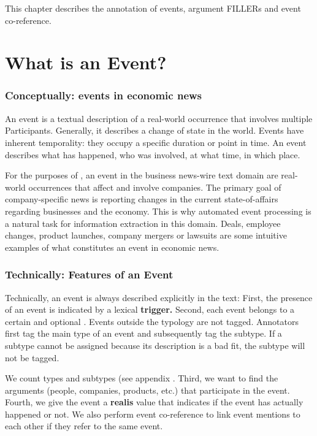 This chapter describes the annotation of events, argument FILLERs and event co-reference.

\section{What is an Event?}

\subsubsection{Conceptually: events in economic news}

An event is a textual description of a real-world occurrence that involves multiple Participants.
Generally, it describes a change of state in the world.
Events have inherent temporality: they occupy a specific duration or point in time.
An event describes what has happened, who was involved, at what time, in which place.

For the purposes of \project, an event in the business news-wire text domain are real-world occurrences that affect and involve companies.
The primary goal of company-specific news is reporting changes in the current state-of-affairs regarding businesses and the economy.
This is why automated event processing is a natural task for information extraction in this domain.
Deals, employee changes, product launches, company mergers or lawsuits are some intuitive examples of what constitutes an event in economic news. 

\subsubsection{Technically: Features of an Event}

Technically, an event is always described explicitly in the text:
First, the presence of an event is indicated by a lexical \textbf{trigger.}
Second, each event belongs to a certain  and optional .
Events outside the typology are not tagged.
Annotators first tag the main type of an event and subsequently tag the subtype.
If a subtype cannot be assigned because its description is a bad fit, the subtype will not be tagged.

We count \typecount types and \subtypecount subtypes (see appendix . 
Third, we want to find the arguments (people, companies, products, etc.) that participate in the event.
Fourth, we give the event a \textbf{realis} value that indicates if the event has actually happened or not.
We also perform event co-reference to link event mentions to each other if they refer to the same event.

